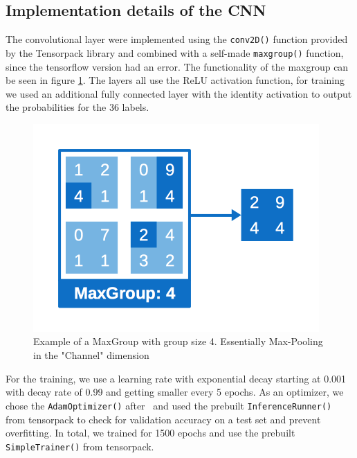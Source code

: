 \documentclass{utue} %
\begin{document}
\subsection{Implementation details of the CNN}
The convolutional layer were implemented using the \texttt{conv2D()} function provided by the Tensorpack library and combined with a self-made \texttt{maxgroup()} function, since the tensorflow version had an error. The functionality of the maxgroup can be seen in figure \ref{fig:impl_maxgroup}. The layers all use the ReLU activation function, for training we used an additional fully connected layer with the identity activation to output the probabilities for the 36 labels. \\
\begin{figure}[h!]
	\centering
	\includegraphics[width=.9\columnwidth]{graphics/impl_maxgroups.png}
	\caption{\label{fig:impl_maxgroup} Example of a MaxGroup with group size 4. Essentially Max-Pooling in the "Channel" dimension}
\end{figure}

For the training, we use a learning rate with exponential decay starting at 0.001 with decay rate of 0.99 and getting smaller every 5 epochs. As an optimizer, we chose the \texttt{AdamOptimizer()} after~\cite{Adam} and used the prebuilt \texttt{InferenceRunner()} from tensorpack to check for validation accuracy on a test set and prevent overfitting. In total, we trained for 1500 epochs and use the prebuilt \texttt{SimpleTrainer()} from tensorpack.
\end{document}
